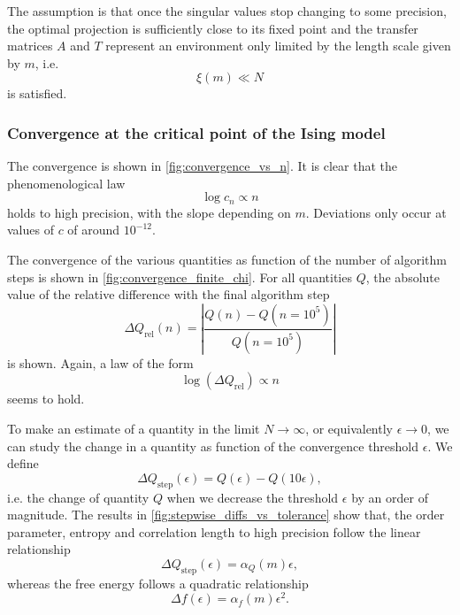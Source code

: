 The assumption is that once the singular values stop changing to some precision, the optimal projection is sufficiently
close to its fixed point and the transfer matrices $A$ and $T$ represent an environment only limited by the length scale
given by $m$, i.e.
\begin{equation}
  \xi(m) \ll N
\end{equation}
is satisfied.

\subsubsection{Convergence at the critical point of the Ising model}
The convergence is shown in \autoref{fig:convergence_vs_n}. It is clear that the
phenomenological law
\begin{equation}\label{eq:convergence_vs_n_semilogarithmic_law}
  \log c_n \propto n
\end{equation}
holds to high precision, with the slope depending on $m$.
Deviations only occur at values of $c$ of around $10^{-12}$.

The convergence of the various quantities as function of the number of algorithm steps is shown in
\autoref{fig:convergence_finite_chi}. For all quantities $Q$, the absolute value of the relative difference
with the final algorithm step
\begin{equation}\label{eq:abs_rel_diff}
  \Delta Q_{\text{rel}}(n) = \left| \frac{Q(n) - Q(n = 10^5)}{Q(n = 10^5)} \right|
\end{equation}
is shown. Again, a law of the form
\begin{equation}\label{eq:abs_rel_diff_vs_n_semilogarithmic_law}
  \log(\Delta Q_{\text{rel}}) \propto n
\end{equation}
seems to hold.

To make an estimate of a quantity in the limit $N \to \infty$, or equivalently $\epsilon \to 0$,
we can study the change in a quantity as function of the convergence threshold $\epsilon$. We define
\begin{equation}\label{eq:stepwise_difference_epsilon}
  \Delta Q_{\text{step}}(\epsilon) = Q(\epsilon) - Q(10\epsilon),
\end{equation}
i.e. the change of quantity $Q$ when we decrease the threshold $\epsilon$ by an order of magnitude. The results in
\autoref{fig:stepwise_diffs_vs_tolerance} show that, the order parameter, entropy and correlation length
to high precision follow the linear relationship
\begin{equation}\label{eq:stepwise_difference_linear}
  \Delta Q_{\text{step}}(\epsilon) = \alpha_{Q}(m) \epsilon,
\end{equation}
whereas the free energy follows a quadratic relationship
\begin{equation}\label{eq:stepwise_difference_quadratic}
  \Delta f(\epsilon) = \alpha_{f}(m) \epsilon^2.
\end{equation}

